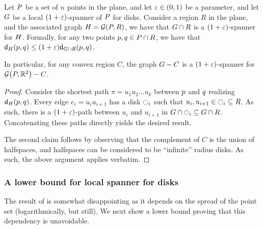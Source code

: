 \documentclass[12pt]{article}%
\begin{document}
\begin{corollary}
    Let $P$ be a set of $n$ points in the plane, and let
    $\varepsilon \in (0,1)$ be a parameter, and let $G$ be a local
    $(1+\varepsilon)$-spanner of $P$ for disks. Consider a region $R$ in
    the plane, and the associated graph $\GA = \GY{\PS}{R}$, we have
    that $G \cap {R}$ is a $(1+\varepsilon)$-spanner for
    $H$. Formally, for any two points $p, q \in P \cap R$, we
    have that
    $\dGZ{\GA}{\pa}{\pb} \leq
    (1+\eps)\dGZ{\restrictY{\G}{R}}{\pa}{\pb}$.

    In particular, for any convex region $C$, the graph $G - C$
    is a $(1+\varepsilon)$-spanner for $\GY{\PS}{\Re^2} \gminus C$.
\end{corollary}
\begin{proof}
    Consider the shortest path $\pi = u_1 u_2 \ldots u_k$ between
    $p$ and $q$ realizing $\dGZ{\GA}{\pa}{\pb}$. Every edge
    $e_i = u_i u_{i+1}$ has a disk $\ocircle_i$ such that
    $u_i, u_{i+1} \in \ocircle_i \subseteq R$. As such, there is a
    $(1+\varepsilon)$-path between $u_i$ and $u_{i+1}$ in
    $G \cap {\ocircle_i} \subseteq
    G \cap {R}$. Concatenating these paths directly yields the
    desired result.

    The second claim follows by observing that the complement of $C$
    is the union of halfspaces, and halfspaces can be considered to be
    ``infinite'' radius disks. As such, the above argument applies
    verbatim.
\end{proof}




\subsubsection{A lower bound for local spanner for disks}


The result of  is somewhat disappointing as it depends
on the spread of the point set (logarithmically, but still).
We next show a lower bound proving that this dependency is
unavoidable. 
\end{document}
